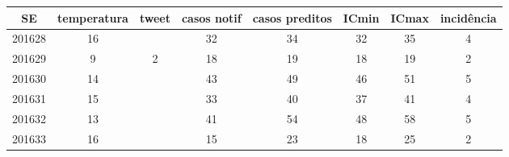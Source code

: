 \begin{tabular}{c|ccccccc}
  \hline
SE & temperatura & tweet & casos notif & casos preditos & ICmin & ICmax & incidência \\ 
  \hline
201628 & 16 &  & 32 & 34 & 32 & 35 & 4 \\ 
  201629 & 9 & 2 & 18 & 19 & 18 & 19 & 2 \\ 
  201630 & 14 &  & 43 & 49 & 46 & 51 & 5 \\ 
  201631 & 15 &  & 33 & 40 & 37 & 41 & 4 \\ 
  201632 & 13 &  & 41 & 54 & 48 & 58 & 5 \\ 
  201633 & 16 &  & 15 & 23 & 18 & 25 & 2 \\ 
   \hline
\end{tabular}
